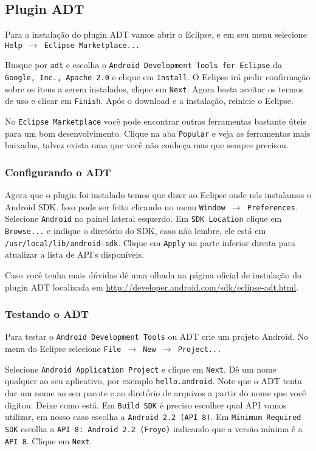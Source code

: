 \subsection{Plugin ADT}

Para a instalação do plugin ADT vamos abrir o Eclipse, e em seu menu selecione \texttt{Help $\rightarrow$
Eclipse Marketplace...}

Busque por \texttt{adt} e escolha o \texttt{Android Development Tools for Eclipse} da \texttt{Google, Inc.,
Apache 2.0} e clique em \texttt{Install}. O Eclipse irá pedir confirmação sobre os itens a serem instalados,
clique em \texttt{Next}. Agora basta aceitar os termos de uso e clicar em \texttt{Finish}. Após o download
e a instalação, reinicie o Eclipse.

No \texttt{Eclipse Marketplace} você pode encontrar outras ferramentas bastante úteis para um bom desenvolvimento.
Clique na aba \texttt{Popular} e veja as ferramentas mais baixadas, talvez exista uma que você não conheça
mas que sempre precisou.

\subsubsection{Configurando o ADT}

Agora que o plugin foi instalado temos que dizer ao Eclipse onde nós instalamos o Android SDK. Isso
pode ser feito clicando no menu \texttt{Window $\rightarrow$ Preferences}. Selecione \texttt{Android} no painel
lateral esquerdo. Em \texttt{SDK Location} clique em \texttt{Browse...} e indique o diretório do SDK,
caso não lembre, ele está em \texttt{/usr/local/lib/android-sdk}. Clique em \texttt{Apply} na parte inferior
direita para atualizar a lista de API's disponíveis.

Caso você tenha mais dúvidas dê uma olhada na página oficial de instalação do plugin ADT localizada em
\url{http://developer.android.com/sdk/eclipse-adt.html}.

\subsubsection{Testando o ADT \label{sssec:testando}}

Para testar o \texttt{Android Development Tools} ou ADT crie um projeto Android. No menu do Eclipse selecione
\texttt{File $\rightarrow$ New $\rightarrow$ Project...}

Selecione \texttt{Android Application Project} e clique em \texttt{Next}. Dê um nome qualquer ao seu aplicativo,
por exemplo \texttt{hello.android}. Note que o ADT tenta dar um nome ao seu pacote e ao diretório de arquivos
a partir do nome que você digitou. Deixe como está. Em \texttt{Build SDK} é preciso escolher qual API vamos
utilizar, em nosso caso escolha a \texttt{Android 2.2 (API 8)}. Em \texttt{Minimum Required SDK} escolha
a \texttt{API 8: Android 2.2 (Froyo)} indicando que a versão mínima é a \texttt{API 8}. Clique em \texttt{Next}.

